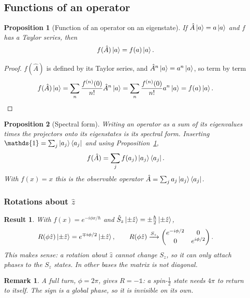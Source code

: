 \documentclass{article}
\newtheorem{remark}{Remark}
\newtheorem{proposition}{Proposition}
\newtheorem{result}{Result}
\newcommand{\id}{\mathds{1}}
\begin{document}
\subsection{Functions of an operator}
\begin{proposition}[Function of an operator on an eigenstate]
    \label{prop:function-eigenstate}
    If $\hat{A}\ket{a} = a\ket{a}$ and $f$ has a Taylor series, then
    \begin{equation}
        f(\hat{A})\ket{a} = f(a)\ket{a}.
    \end{equation}
\end{proposition}
\begin{proof}
    $f(\hat{A})$ is defined by its Taylor series, and $\hat{A}^n\ket{a} = a^n\ket{a}$, so term by term
    \[f(\hat{A})\ket{a} = \sum_{n}\frac{f^{(n)}(0)}{n!}\hat{A}^n\ket{a} = \sum_{n}\frac{f^{(n)}(0)}{n!}a^n\ket{a} = f(a)\ket{a}.\]
\end{proof}
\begin{proposition}[Spectral form]
    Writing an operator as a sum of its eigenvalues times the projectors onto its eigenstates is its spectral form. Inserting $\id = \sum_j\ket{a_j}\bra{a_j}$ and using Proposition~\ref{prop:function-eigenstate},
    \begin{equation}
        f(\hat{A}) = \sum_j f(a_j)\ket{a_j}\bra{a_j}.
    \end{equation}
    With $f(x) = x$ this is the observable operator $\hat{A} = \sum_j a_j\ket{a_j}\bra{a_j}$.
\end{proposition}

\subsubsection{Rotations about \texorpdfstring{$\hat{z}$}{z}}
\begin{result}
    With $f(x) = e^{-i\phi x/\hbar}$ and $\hat{S}_z\ket{\pm\hat{z}} = \pm\frac{\hbar}{2}\ket{\pm\hat{z}}$,
    \begin{equation}
        R(\phi\hat{z})\ket{\pm\hat{z}} = e^{\mp i\phi/2}\ket{\pm\hat{z}}, \qquad R(\phi\hat{z}) \xrightarrow{S_z} \begin{pmatrix} e^{-i\phi/2} & 0 \\ 0 & e^{i\phi/2} \end{pmatrix}.
    \end{equation}
    This makes sense: a rotation about $\hat{z}$ cannot change $S_z$, so it can only attach phases to the $S_z$ states. In other bases the matrix is not diagonal.
\end{result}
\begin{remark}
    \label{rem:2pi}
    A full turn, $\phi = 2\pi$, gives $R = -\id$: a spin-$\tfrac12$ state needs $4\pi$ to return to itself. The sign is a global phase, so it is invisible on its own.
\end{remark}
\end{document}
